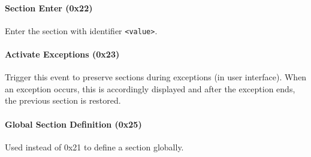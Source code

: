 \paragraph{Section Enter (0x22)} Enter the section with identifier
\verb|<value>|.

\paragraph{Activate Exceptions (0x23)} Trigger this event to preserve
sections during exceptions (in user interface). When an exception
occurs, this is accordingly displayed and after the exception ends,
the previous section is restored.

\paragraph{Global Section Definition (0x25)} Used instead of 0x21 to
define a section globally.


